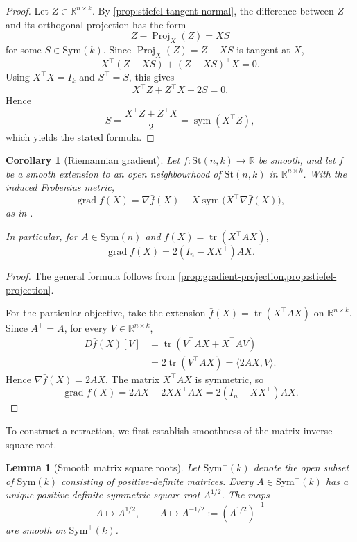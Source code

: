 \documentclass[12pt]{article}
\theoremstyle{definition}
\theoremstyle{plain}
\newtheorem{lemma}[definition]{Lemma}
\newtheorem{corollary}[definition]{Corollary}
\theoremstyle{remark}
\newcommand{\R}{\mathbb{R}}
\newcommand{\St}{\mathrm{St} (n,k)}
\newcommand{\Sym}{\mathrm{Sym}}              %
\DeclareMathOperator{\sym}{sym}              %
\DeclareMathOperator{\tr}{tr}
\DeclareMathOperator{\grad}{grad}            %
\DeclareMathOperator{\Proj}{Proj}            %
\begin{document}
\begin{proof}
  Let \( Z \in \R^{n \times k} \). By \cref{prop:stiefel-tangent-normal}, the difference between \( Z \) and its orthogonal projection has the form
  \[
    Z - \Proj_X(Z) = XS
  \]
  for some \( S \in \Sym(k) \).
  Since \( \Proj_X(Z) = Z - XS \) is tangent at \( X \),
  \[
    X^\top(Z-XS) + (Z-XS)^\top X = 0.
  \]
  Using \( X^\top X = I_k \) and \( S^\top = S \), this gives
  \[
    X^\top Z + Z^\top X - 2S = 0.
  \]
  Hence
  \[
    S = \frac{X^\top Z + Z^\top X}{2} = \sym(X^\top Z),
  \]
  which yields the stated formula.
\end{proof}

\begin{corollary}[Riemannian gradient]\label{cor:stiefel-gradient}
  Let \( f : \St \longrightarrow \R \) be smooth, and let \( \bar{f} \) be a smooth extension to an open neighbourhood of \( \St \) in \( \R^{n \times k} \).
  With the induced Frobenius metric,
  \[
    \grad f(X) = \nabla\bar{f}(X) - X\sym\bigl(X^\top\nabla\bar{f}(X)\bigr),
  \]
  as in \cite[Section 7.3, equation (7.28)]{boumal}.

  In particular, for \( A \in \Sym(n) \) and \( f(X) = \tr(X^\top A X) \),
  \[
    \grad f(X) = 2(I_n-XX^\top)AX.
  \]
\end{corollary}

\begin{proof}
  The general formula follows from \cref{prop:gradient-projection,prop:stiefel-projection}.

  For the particular objective, take the extension \( \bar{f}(X) = \tr(X^\top A X) \) on \( \R^{n \times k} \).
  Since \( A^\top = A \), for every \( V \in \R^{n \times k} \),
  \[
    \begin{aligned}
      D\bar{f}(X)[V]
      &= \tr(V^\top AX + X^\top AV) \\
      &= 2\tr(V^\top AX) = \langle 2AX,V\rangle.
    \end{aligned}
  \]
  Hence \( \nabla\bar{f}(X) = 2AX \).
  The matrix \( X^\top AX \) is symmetric, so
  \[
    \grad f(X) = 2AX - 2XX^\top AX = 2(I_n-XX^\top)AX.
  \]
\end{proof}

To construct a retraction, we first establish smoothness of the matrix inverse square root.

\begin{lemma}[Smooth matrix square roots]\label{lem:smooth-matrix-square-root}
  Let \( \Sym^+(k) \) denote the open subset of \( \Sym(k) \) consisting of positive-definite matrices.
  Every \( A \in \Sym^+(k) \) has a unique positive-definite symmetric square root \( A^{1/2} \). The maps
  \[
    A \longmapsto A^{1/2}, \qquad A \longmapsto A^{-1/2} := (A^{1/2})^{-1}
  \]
  are smooth on \( \Sym^+(k) \).
\end{lemma}
\end{document}
